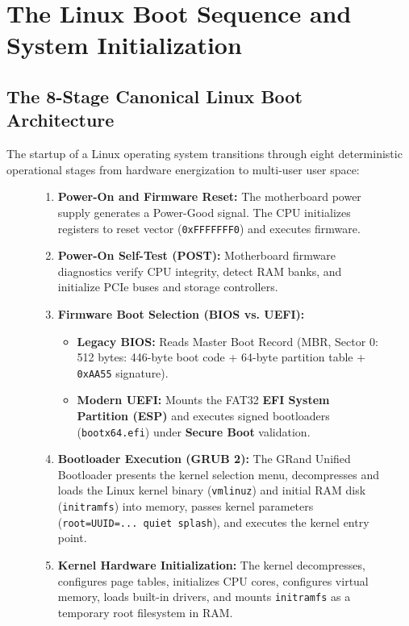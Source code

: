 \section{The Linux Boot Sequence and System Initialization}
\label{sec:os_linux_boot}

\subsection{The 8-Stage Canonical Linux Boot Architecture}
The startup of a Linux operating system transitions through eight deterministic operational stages from hardware energization to multi-user user space:

\begin{figure}[htbp]
\centering
\begin{tcolorbox}[colback=codebg, colframe=primary, title=\textbf{The Eight Stages of the Linux Boot Pipeline}]
\begin{enumerate}
    \item \textbf{Power-On and Firmware Reset:} The motherboard power supply generates a Power-Good signal. The CPU initializes registers to reset vector (\texttt{0xFFFFFFF0}) and executes firmware.
    \item \textbf{Power-On Self-Test (POST):} Motherboard firmware diagnostics verify CPU integrity, detect RAM banks, and initialize PCIe buses and storage controllers.
    \item \textbf{Firmware Boot Selection (BIOS vs. UEFI):}
    \begin{itemize}
        \item \textbf{Legacy BIOS:} Reads Master Boot Record (MBR, Sector 0: 512 bytes: 446-byte boot code + 64-byte partition table + \texttt{0xAA55} signature).
        \item \textbf{Modern UEFI:} Mounts the FAT32 \textbf{EFI System Partition (ESP)} and executes signed bootloaders (\texttt{bootx64.efi}) under \textbf{Secure Boot} validation.
    \end{itemize}
    \item \textbf{Bootloader Execution (GRUB 2):} The GRand Unified Bootloader presents the kernel selection menu, decompresses and loads the Linux kernel binary (\texttt{vmlinuz}) and initial RAM disk (\texttt{initramfs}) into memory, passes kernel parameters (\texttt{root=UUID=... quiet splash}), and executes the kernel entry point.
    \item \textbf{Kernel Hardware Initialization:} The kernel decompresses, configures page tables, initializes CPU cores, configures virtual memory, loads built-in drivers, and mounts \texttt{initramfs} as a temporary root filesystem in RAM.

\end{enumerate}
\end{tcolorbox}
\end{figure}
